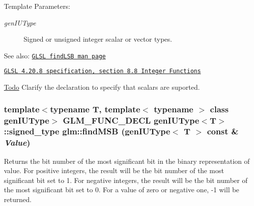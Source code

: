 \begin{Desc}
\item[Template Parameters:]
\begin{description}
\item[{\em genIUType}]Signed or unsigned integer scalar or vector types.\end{description}
\end{Desc}
\begin{Desc}
\item[See also:]\href{http://www.opengl.org/sdk/docs/manglsl/xhtml/findLSB.xml}{\tt GLSL findLSB man page} 

\href{http://www.opengl.org/registry/doc/GLSLangSpec.4.20.8.pdf}{\tt GLSL 4.20.8 specification, section 8.8 Integer Functions}\end{Desc}
\begin{Desc}
\item[\hyperlink{todo__todo000046}{Todo}]Clarify the declaration to specify that scalars are suported. \end{Desc}
\hypertarget{group__core__func__integer_g13ed58e71232a63dbc132b1be0f0ee9a}{
\subsubsection[findMSB]{\setlength{\rightskip}{0pt plus 5cm}template$<$typename T, template$<$ typename $>$ class genIUType$>$ GLM\_\-FUNC\_\-DECL genIUType$<$T$>$::signed\_\-type glm::findMSB (genIUType$<$ T $>$ const \& {\em Value})}}
\label{group__core__func__integer_g13ed58e71232a63dbc132b1be0f0ee9a}


Returns the bit number of the most significant bit in the binary representation of value. For positive integers, the result will be the bit number of the most significant bit set to 1. For negative integers, the result will be the bit number of the most significant bit set to 0. For a value of zero or negative one, -1 will be returned.

